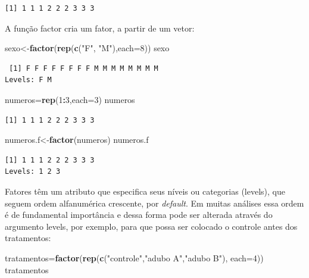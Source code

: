 \documentclass[12pt,brazil,oneside]{book}
\newenvironment{Shaded}{\begin{snugshade}}{\end{snugshade}}
\newcommand{\DataTypeTok}[1]{\textcolor[rgb]{0.13,0.29,0.53}{#1}}
\newcommand{\DecValTok}[1]{\textcolor[rgb]{0.00,0.00,0.81}{#1}}
\newcommand{\KeywordTok}[1]{\textcolor[rgb]{0.13,0.29,0.53}{\textbf{#1}}}
\newcommand{\NormalTok}[1]{#1}
\newcommand{\OperatorTok}[1]{\textcolor[rgb]{0.81,0.36,0.00}{\textbf{#1}}}
\newcommand{\StringTok}[1]{\textcolor[rgb]{0.31,0.60,0.02}{#1}}
\begin{document}
\begin{verbatim}
[1] 1 1 1 2 2 2 3 3 3
\end{verbatim}

A função factor cria um fator, a partir de um vetor:

\begin{Shaded}
\begin{Highlighting}[]
\NormalTok{sexo<-}\KeywordTok{factor}\NormalTok{(}\KeywordTok{rep}\NormalTok{(}\KeywordTok{c}\NormalTok{(}\StringTok{"F"}\NormalTok{, }\StringTok{"M"}\NormalTok{),}\DataTypeTok{each=}\DecValTok{8}\NormalTok{))}
\NormalTok{sexo}
\end{Highlighting}
\end{Shaded}

\begin{verbatim}
 [1] F F F F F F F F M M M M M M M M
Levels: F M
\end{verbatim}

\begin{Shaded}
\begin{Highlighting}[]
\NormalTok{numeros=}\KeywordTok{rep}\NormalTok{(}\DecValTok{1}\OperatorTok{:}\DecValTok{3}\NormalTok{,}\DataTypeTok{each=}\DecValTok{3}\NormalTok{)}
\NormalTok{numeros}
\end{Highlighting}
\end{Shaded}

\begin{verbatim}
[1] 1 1 1 2 2 2 3 3 3
\end{verbatim}

\begin{Shaded}
\begin{Highlighting}[]
\NormalTok{numeros.f<-}\KeywordTok{factor}\NormalTok{(numeros)}
\NormalTok{numeros.f}
\end{Highlighting}
\end{Shaded}

\begin{verbatim}
[1] 1 1 1 2 2 2 3 3 3
Levels: 1 2 3
\end{verbatim}

Fatores têm um atributo que especifica seus níveis ou categorias (levels), que seguem ordem alfanumérica crescente, por \emph{default}. Em muitas análises essa ordem é de fundamental importância e dessa forma pode ser alterada através do argumento levels, por exemplo, para que possa ser colocado o controle antes dos tratamentos:

\begin{Shaded}
\begin{Highlighting}[]
\NormalTok{tratamentos=}\KeywordTok{factor}\NormalTok{(}\KeywordTok{rep}\NormalTok{(}\KeywordTok{c}\NormalTok{(}\StringTok{"controle"}\NormalTok{,}\StringTok{"adubo A"}\NormalTok{,}\StringTok{"adubo B"}\NormalTok{), }\DataTypeTok{each=}\DecValTok{4}\NormalTok{))}
\NormalTok{tratamentos}
\end{Highlighting}
\end{Shaded}
\end{document}
